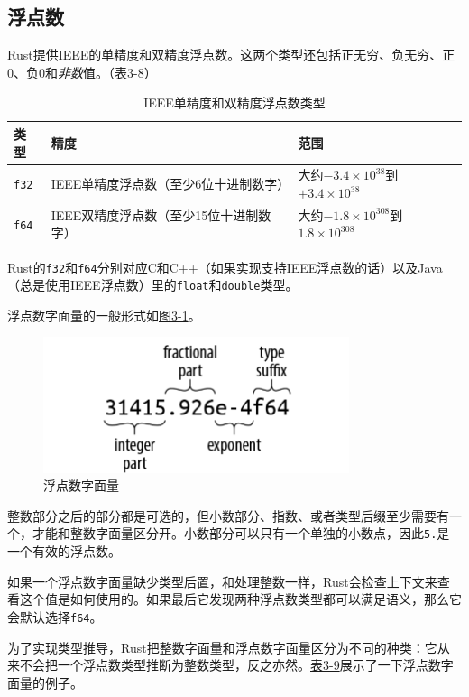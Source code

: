 \subsection{浮点数}
Rust提供IEEE的单精度和双精度浮点数。这两个类型还包括正无穷、负无穷、正0、负0和\emph{非数}值。（\hyperref[t3-8]{表3-8}）

\begin{table}[htbp]
    \centering
    \caption{IEEE单精度和双精度浮点数类型}
    \label{t3-8}
    \begin{tabular}{lll}
        \hline
        \textbf{类型}   & \textbf{精度} &   \textbf{范围}   \\
        \hline
        \texttt{f32}    & IEEE单精度浮点数（至少6位十进制数字）    & 大约$-3.4\times10^{38}$到$+3.4\times10^{38}$    \\
        \rowcolor{tablecolor}
        \texttt{f64}    & IEEE双精度浮点数（至少15位十进制数字）    & 大约$-1.8\times10^{308}$到$1.8\times10^{308}$   \\
    \end{tabular}
\end{table}

Rust的\texttt{f32}和\texttt{f64}分别对应C和C++（如果实现支持IEEE浮点数的话）以及Java（总是使用IEEE浮点数）里的\texttt{float}和\texttt{double}类型。

浮点数字面量的一般形式如\hyperref[f3-1]{图3-1}。
\begin{figure}[htbp]
    \centering
    \includegraphics[width=0.8\textwidth]{../img/f3-1.png}
    \caption{浮点数字面量}
    \label{f3-1}
\end{figure}

整数部分之后的部分都是可选的，但小数部分、指数、或者类型后缀至少需要有一个，才能和整数字面量区分开。小数部分可以只有一个单独的小数点，因此\texttt{5.}是一个有效的浮点数。

如果一个浮点数字面量缺少类型后置，和处理整数一样，Rust会检查上下文来查看这个值是如何使用的。如果最后它发现两种浮点数类型都可以满足语义，那么它会默认选择\texttt{f64}。

为了实现类型推导，Rust把整数字面量和浮点数字面量区分为不同的种类：它从来不会把一个浮点数类型推断为整数类型，反之亦然。\hyperref[t3-9]{表3-9}展示了一下浮点数字面量的例子。


